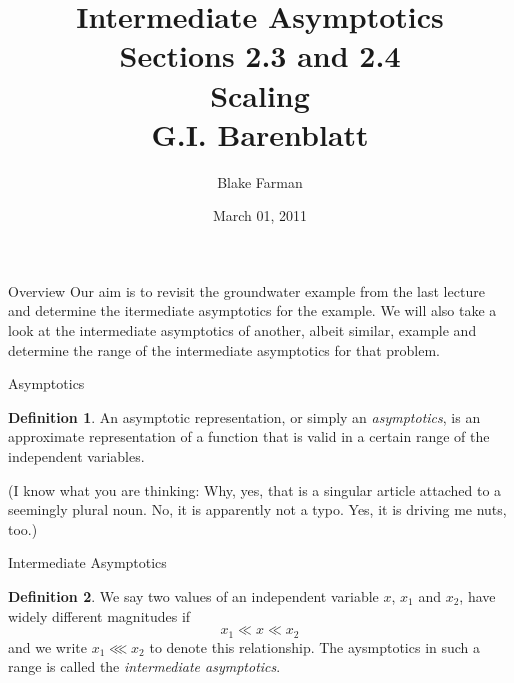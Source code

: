 \documentclass[10pt]{beamer}
\author{Blake Farman}
\title{Intermediate Asymptotics\\
  Sections 2.3 and 2.4\\
  Scaling\\
  G.I. Barenblatt\\
}
\institute{
  Department of Mathematics and Statistics\\
  University of Vermont\\
  Burlington, Vermont 05405\\[1ex]
  \texttt{bfarman@cems.uvm.edu}
}
\date{March 01, 2011}
\begin{document}
\newcommand{\Z}{\mathbb{Z}}
\newcommand{\R}{\mathbb{R}}
\newcommand{\Q}{\mathbb{Q}}
\newcommand{\FF}{\mathbb{F}}
\newcommand{\F}{\mathbb{F}}

\renewcommand{\qedsymbol}{\(\blacksquare\)}
\newcommand{\znz}[1]{\Z / #1\Z}
\newcommand{\mznz}[1]{(\Z / #1\Z)^*}

\renewcommand{\phi}{\varphi}
\newenvironment{alphaenum}{
  \begin{enumerate}
    \renewcommand{\theenumi}{(\alph{enumi})}
    \renewcommand{\labelenumi}{\theenumi}
  }
  {\end{enumerate}}

\theoremstyle{definition}
\newtheorem{defn}{Definition}[section]

\begin{frame}[plain]
  \titlepage
\end{frame}

\begin{frame}{Overview}
  Our aim is to revisit the groundwater example from the last lecture and determine the itermediate asymptotics for the example.
  We will also take a look at the intermediate asymptotics of another, albeit similar, example and determine the range of the intermediate asymptotics for that problem.
\end{frame}

\begin{frame}{Asymptotics}
  \begin{defn}
    An asymptotic representation, or simply an {\it asymptotics}, is an approximate representation of a function that is valid in a certain range of the independent variables.
  \end{defn}
  (I know what you are thinking: Why, yes, that is a singular article attached to a seemingly plural noun.  No, it is apparently not a typo.  Yes, it is driving me nuts, too.)
\end{frame}

\begin{frame}{Intermediate Asymptotics}
  \begin{defn}
    We say two values of an independent variable $x$, $x_1$ and $x_2$, have widely different magnitudes if 
    $$x_1 \ll x \ll x_2$$ 
    and we write $x_1 \lll x_2$ to denote this relationship.
    The aysmptotics in such a range is called the {\it intermediate asymptotics}.  
  \end{defn}
\end{frame}
\end{document}
